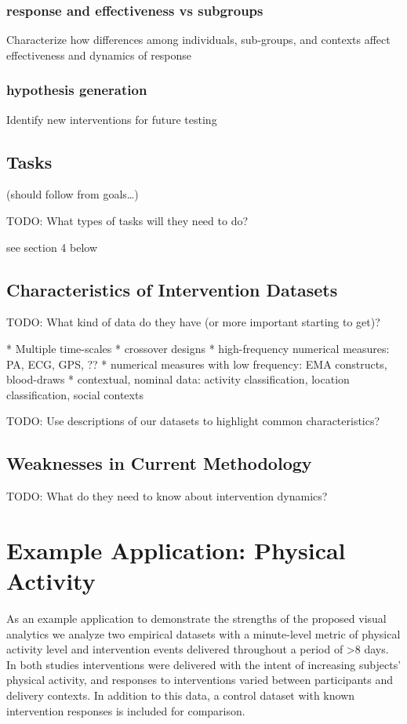 \documentclass[review,journal]{vgtc}         %
\begin{document}
\subsubsection{response and effectiveness vs subgroups}
Characterize how differences among individuals, sub-groups, and contexts affect effectiveness and dynamics of response

\subsubsection{hypothesis generation}
Identify new interventions for future testing

\subsection{Tasks}
(should follow from goals…)

TODO: What types of tasks will they need to do?

see section 4 below


\subsection{Characteristics of Intervention Datasets}

TODO: What kind of data do they have (or more important starting to get)?  

* Multiple time-scales
* crossover designs
* high-frequency numerical measures: PA, ECG, GPS, ??
* numerical measures with low frequency: EMA constructs, blood-draws
* contextual, nominal data: activity classification, location classification, social contexts

TODO: Use descriptions of our datasets to highlight common characteristics?

\subsection{Weaknesses in Current Methodology}

TODO: What do they need to know about intervention dynamics?

\section{Example Application: Physical Activity}
As an example application to demonstrate the strengths of the proposed visual analytics we analyze two empirical datasets with a minute-level metric of physical activity level and intervention events delivered throughout a period of >8 days.
In both studies interventions were delivered with the intent of increasing subjects’ physical activity, and responses to interventions varied between participants and delivery contexts.
In addition to this data, a control dataset with known intervention responses is included for comparison.
\end{document}
